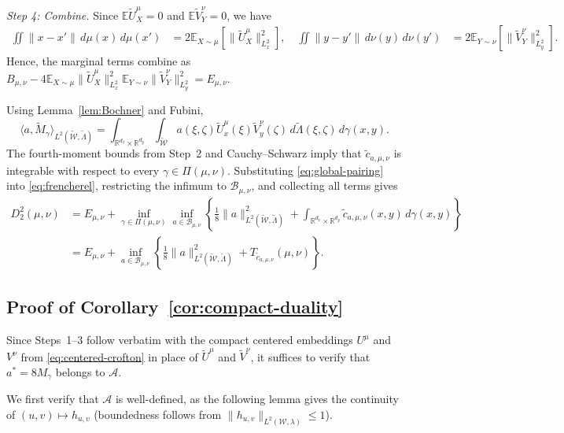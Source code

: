 \documentclass[11pt]{amsart}
\theoremstyle{definition}
\theoremstyle{remark}
\newcommand{\R}{\mathbb{R}}
\newcommand{\E}{\mathbb{E}}
\newcommand{\1}{\mathbf{1}}
\numberwithin{equation}{section}
\begin{document}
\emph{Step 4: Combine.}
Since $\E \widetilde U_X^\mu=0$ and $\E \widetilde V_Y^\nu=0$, we have
\begin{align*}
\iint\|x-x'\|\,d\mu(x)\,d\mu(x')
&=
2\E_{X\sim\mu}\left[\|\widetilde U_X^\mu\|_{L^2_x}^2\right], \quad
\iint\|y-y'\|\,d\nu(y)\,d\nu(y')
&=
2\E_{Y\sim\nu}\left[\|\widetilde V_Y^\nu\|_{L^2_y}^2\right].
\end{align*}
Hence, the marginal terms combine as
$B_{\mu,\nu}
-
4\E_{X\sim\mu}\|\widetilde U_X^\mu\|_{L^2_x}^2
\E_{Y\sim\nu}\|\widetilde V_Y^\nu\|_{L^2_y}^2
=
E_{\mu,\nu}$.

Using Lemma~\ref{lem:Bochner} and Fubini,
\begin{equation}\label{eq:global-pairing}
\langle a,\widetilde M_\gamma\rangle_{L^2(\widetilde{\mathcal W},\widetilde\Lambda)}
=
\int_{\R^{d_x}\times\R^{d_y}}
\int_{\widetilde{\mathcal W}}
a(\xi,\zeta)\widetilde U_x^\mu(\xi)\widetilde V_y^\nu(\zeta)
\,d\widetilde\Lambda(\xi,\zeta)\,d\gamma(x,y).
\end{equation}
The fourth-moment bounds from Step~2 and Cauchy--Schwarz imply that
$\widetilde c_{a,\mu,\nu}$ is integrable with respect to every
$\gamma\in\Pi(\mu,\nu)$. Substituting \eqref{eq:global-pairing} into
\eqref{eq:frencherel}, restricting the infimum to
$\mathcal B_{\mu,\nu}$, and collecting all terms gives
\begin{align*}
D_2^2(\mu,\nu)
&=
E_{\mu,\nu}
+
\inf_{\gamma\in\Pi(\mu,\nu)}
\inf_{a\in\mathcal B_{\mu,\nu}}
\left\{
\frac18\|a\|_{L^2(\widetilde{\mathcal W},\widetilde\Lambda)}^2
+
\int_{\R^{d_x}\times\R^{d_y}}
\widetilde c_{a,\mu,\nu}(x,y)\,d\gamma(x,y)
\right\}\\
&=
E_{\mu,\nu}
+
\inf_{a\in\mathcal B_{\mu,\nu}}
\left\{
\frac18\|a\|_{L^2(\widetilde{\mathcal W},\widetilde\Lambda)}^2
+
T_{\widetilde c_{a,\mu,\nu}}(\mu,\nu)
\right\}.
\end{align*}
\subsection{Proof of Corollary~\ref{cor:compact-duality}}
\label{pf:compact-duality-proof}
Since Steps~1--3 follow verbatim with the compact centered embeddings $U^\mu$ and $V^\nu$ from
\eqref{eq:centered-crofton} in place of $\widetilde U^\mu$ and $\widetilde V^\nu$, it suffices to verify that $a^*=8M_\gamma$ belongs to
$\mathcal A$.

We first verify that $\mathcal A$ is well-defined, as the following lemma gives
the continuity of $(u,v)\mapsto h_{u,v}$ (boundedness follows from
$\|h_{u,v}\|_{L^2(\mathcal W,\lambda)}\leq1$).
\end{document}

